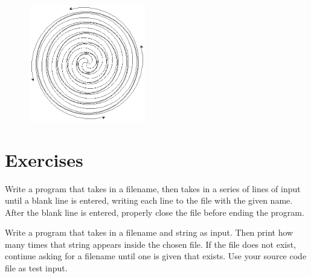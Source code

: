 \documentclass[11pt]{cselabheader}
\begin{document}
\begin{figure}[h]
  \centering
  \includegraphics[width=2.0in]{img/fancy_spiral}
\end{figure}

\pagebreak
\section{Exercises}
\label{sec:ex}

\begin{ex}[save.py] Write a program that takes in a filename, then takes in
  a series of lines of input until a blank line is entered, writing each line to
  the file with the given name. After the blank line is entered, properly close
  the file before ending the program.  
\end{ex}

\begin{ex} Write a program that
  takes in a filename and string as input. Then print how many times that string
  appears inside the chosen file. If the file does not exist, continue asking
  for a filename until one is given that exists. Use your source code file as
  test input.
\end{ex}
\end{document}
